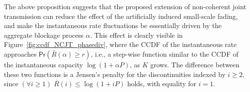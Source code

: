 \documentclass[10pt,journal,a4paper]{IEEEtran}
\newcommand{\E}{\mathsf{E}}		%
\renewcommand{\P}{\mathsf{Pr}} 			%
\newcommand{\stdset}[1]{\mathbbmss{#1}}	%
\renewcommand{\vec}[1]{\bm{#1}}		%
\newtheorem{proposition}{Proposition}
\begin{document}
The above proposition suggests that the proposed extension of non-coherent joint transmission can reduce the effect of the artificially induced small-scale fading, and make the instantaneous rate fluctuations be essentially driven by the aggregate blockage process $\alpha$. This effect is clearly visible in Figure~\ref{fig:ccdf_NCJT_phasediv}, where the CCDF of the instantaneous rate approaches $\P\left(\bar{R}(\alpha)\geq r\right)$, i.e., a step-wise function similar to the CCDF of the instantaneous capacity $\log(1+\alpha P)$, as $K$ grows. The  difference between these two functions is a Jensen's penalty for the discontinuities indexed by $i\geq 2$, since $(\forall i\geq 1)$ $\bar{R}(i) \leq  \log(1+ iP)$ holds, with equality for $i=1$. 
\end{document}
